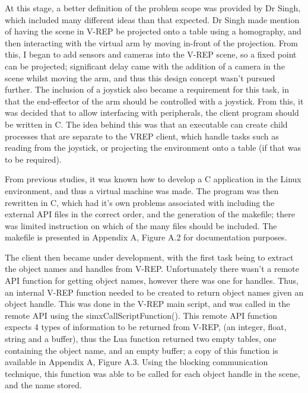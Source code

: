 \documentclass[12pt,openany,a4paper]{book}
\begin{document}


At this stage, a better definition of the problem scope was provided by Dr Singh, which included many different ideas than that expected. Dr Singh made mention of having the scene in V-REP be projected onto a table using a homography, and then interacting with the virtual arm by moving in-front of the projection. From this, I began to add sensors and cameras into the V-REP scene, so a fixed point can be projected; significant delay came with the addition of a camera in the scene whilst moving the arm, and thus this design concept wasn't pursued further. The inclusion of a joystick also became a requirement for this task, in that the end-effector of the arm should be controlled with a joystick. From this, it was decided that to allow interfacing with peripherals, the client program should be written in C. The idea behind this was that an executable can create child processes that are separate to the VREP client, which handle tasks such as reading from the joystick, or projecting the environment onto a table (if that was to be required).

From previous studies, it was known how to develop a C application in the Linux environment, and thus a virtual machine was made. The program was then rewritten in C, which had it's own problems associated with including the external API files in the correct order, and the generation of the makefile; there was limited instruction on which of the many files should be included. The makefile is presented in Appendix A, Figure A.2 for documentation purposes.




The client then became under development, with the first task being to extract the object names and handles from V-REP. Unfortunately there wasn't a remote API function for getting object names, however there was one for handles. Thus, an internal V-REP function needed to be created to return object names given an object handle. This was done in the V-REP main script, and was called in the remote API using the simxCallScriptFunction(). This remote API function expects 4 types of information to be returned from V-REP, (an integer, float, string and a buffer), thus the Lua function returned two empty tables, one containing the object name, and an empty buffer; a copy of this function is available in Appendix A, Figure A.3. Using the blocking communication technique, this function was able to be called for each object handle in the scene, and the name stored.
\end{document}
